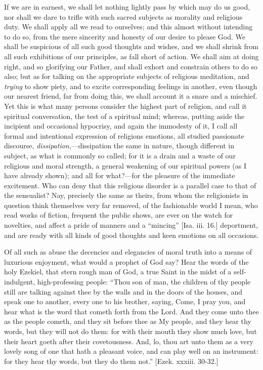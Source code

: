 If we are in earnest, we shall let nothing lightly pass by which may
do us good, nor shall we dare to trifle with such sacred subjects as
morality and religious duty. We shall apply all we read to ourselves;
and this almost without intending to do so, from the mere sincerity and
honesty of our desire to please God. We shall be suspicious of all such
good thoughts and wishes, and we shall shrink from all such exhibitions
of our principles, as fall short of action. We shall aim at doing right,
and so glorifying our Father, and shall exhort and constrain others to
do so also; but as for talking on the appropriate subjects of religious
meditation, and \emph{trying} to show piety, and to excite corresponding
feelings in another, even though our nearest friend, far from doing
this, we shall account it a snare and a mischief. Yet this is what many
persons consider the highest part of religion, and call it spiritual
conversation, the test of a spiritual mind; whereas, putting aside the
incipient and occasional hypocrisy, and again the immodesty of it, I
call all formal and intentional expression of religions emotions, all
studied passionate discourse, \emph{dissipation},—dissipation the same
in nature, though different in subject, as what is commonly so called;
for it is a drain and a waste of our religious and moral strength, a
general weakening of our spiritual powers (as I have already shown); and
all for what?—for the pleasure of the immediate excitement. Who can
deny that this religious disorder is a parallel case to that of the
sensualist? Nay, precisely the same as theirs, from whom the
religionists in question think themselves very far removed, of the
fashionable world I mean, who read works of fiction, frequent the public
shows, are ever on the watch for novelties, and affect a pride of
manners and a ``mincing'' [Isa. iii. 16.] deportment, and are
ready with all kinds of good thoughts and keen emotions on all
occasions.

Of all such as abuse the decencies and elegancies of moral truth into
a means of luxurious enjoyment, what would a prophet of God say? Hear
the words of the holy Ezekiel, that stern rough man of God, a true Saint
in the midst of a self-indulgent, high-professing people: ``Thou son
of man, the children of thy people still are talking against thee by the
walls and in the doors of the houses, and speak one to another, every
one to his brother, saying, Come, I pray you, and hear what is the word
that cometh forth from the Lord. And they come unto thee as the people
cometh, and they sit before thee as My people, and they hear thy words,
but they will not do them: for with their mouth they show much love, but
their heart goeth after their covetousness. And, lo, thou art unto them
as a very lovely song of one that hath a pleasant voice, and can play
well on an instrument: for they hear thy words, but they do them
not.'' [Ezek. xxxiii. 30-32.]


